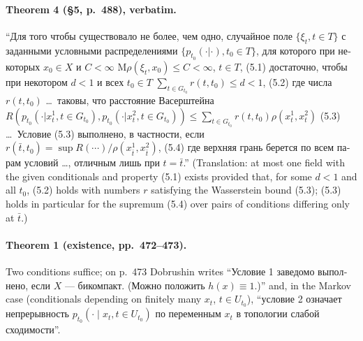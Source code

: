 \documentclass[11pt,a4paper]{article}
\theoremstyle{remark}
\theoremstyle{definition}
\theoremstyle{plain}
\theoremstyle{remark}
\newcommand{\ru}[1]{\foreignlanguage{russian}{#1}}
\begin{document}
\paragraph{Theorem 4 (\S5, p.~488), verbatim.}
``\ru{Для того чтобы существовало не более, чем одно, случайное поле $\{\xi_t, t\in T\}$ с заданными
условными распределениями $\{p_{t_0}(\cdot|\cdot), t_0\in T\}$, для которого при некоторых $x_0\in X$ и
$C<\infty$}
$\mathrm{M}\rho(\xi_t,x_0)\le C<\infty$, $t\in T$, (5.1)
\ru{достаточно, чтобы при некотором $d<1$ и всех $t_0\in T$}
$\sum_{t\in G_{t_0}} r(t,t_0)\le d<1$, (5.2)
\ru{где числа $r(t,t_0)$ \dots\ таковы, что расстояние Васерштейна}
$R(p_{t_0}(\cdot|x^1_t,t\in G_{t_0}),p_{t_0}(\cdot|x^2_t,t\in G_{t_0}))\le\sum_{t\in G_{t_0}}r(t,t_0)\rho(x^1_t,x^2_t)$ (5.3)
\ru{\dots\ Условие (5.3) выполнено, в частности, если}
$r(\bar t,t_0)=\sup R(\cdots)/\rho(x^1_{\bar t},x^2_{\bar t})$, (5.4)
\ru{где верхняя грань берется по всем парам условий \dots, отличным лишь при $t=\bar t$}.''
(Translation: at most one field with the given conditionals and property (5.1) exists provided that, for
some $d<1$ and all $t_0$, (5.2) holds with numbers $r$ satisfying the Wasserstein bound (5.3); (5.3)
holds in particular for the supremum (5.4) over pairs of conditions differing only at $\bar t$.)

\paragraph{Theorem 1 (existence, pp.~472--473).} Two conditions suffice; on p.~473 Dobrushin writes
``\ru{Условие 1 заведомо выполнено, если $X$ --- бикомпакт. (Можно положить $h(x)\equiv1$.)}'' and, in the
Markov case (conditionals depending on finitely many $x_t$, $t\in U_{t_0}$), ``\ru{условие 2 означает
непрерывность $p_{t_0}(\cdot\mid x_t, t\in U_{t_0})$ по переменным $x_t$ в топологии слабой
сходимости}''.
\end{document}
